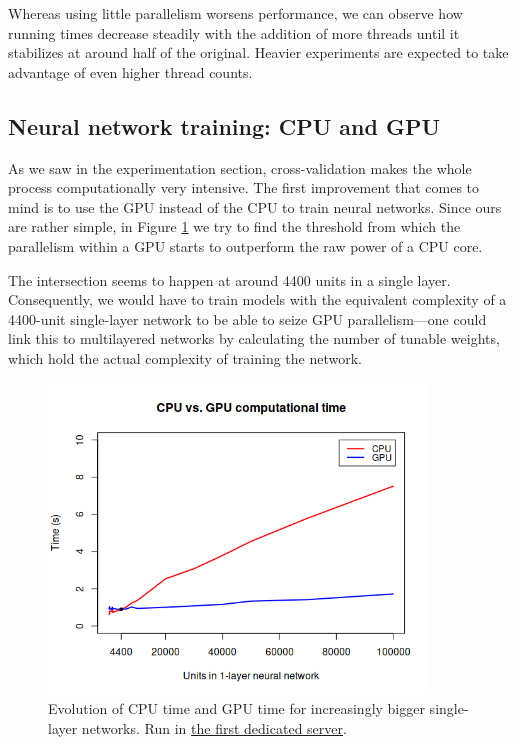 		Whereas using little parallelism worsens performance, we can observe how running times decrease steadily with the addition of more threads until it stabilizes at around half of the original. Heavier experiments are expected to take advantage of even higher thread counts.

	\subsection{Neural network training: CPU and GPU}

		As we saw in the experimentation section, cross-validation makes the whole process computationally very intensive. The first improvement that comes to mind is to use the GPU instead of the CPU to train neural networks. Since ours are rather simple, in Figure \ref{gfx:nn_cpu_gpu} we try to find the threshold from which the parallelism within a GPU starts to outperform the raw power of a CPU core.

		The intersection seems to happen at around 4400 units in a single layer. Consequently, we would have to train models with the equivalent complexity of a 4400-unit single-layer network to be able to seize GPU parallelism---one could link this to multilayered networks by calculating the number of tunable weights, which hold the actual complexity of training the network.

\newpage

		\begin{figure}[bth]

			\myfloatalign
			\includegraphics[width=0.9\textwidth]{gfx/CPUvsGPU.png}
			\caption[Evolution of CPU time and GPU time]{Evolution of CPU time and GPU time for increasingly bigger single-layer networks. Run in \hyperlink{server:firstserver}{the first dedicated server}.}\label{gfx:nn_cpu_gpu}

		\end{figure}

